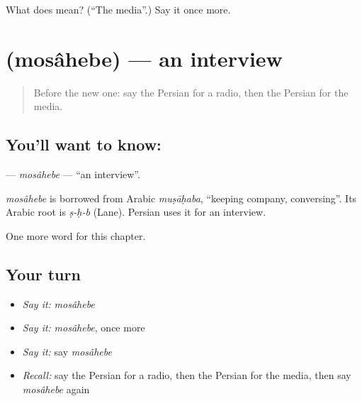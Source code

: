 \begin{tcolorbox}[breakable,colback=teal!4,colframe=teal!35!black,title={Before you move on}]
What does  mean? (\textquotedblleft{}The media\textquotedblright{}.) Say it once more.
\end{tcolorbox}
\section[\texorpdfstring{\fa{مصاحبه} (mosâhebe)}{مصاحبه (mosâhebe)}]{ (mosâhebe) — an interview}

\label{lesson:FA-C210-mosahebe}



\begin{quote}
Before the new one: say the Persian for a radio, then the Persian for the media.
\end{quote}

\subsection*{You'll want to know: }
\textbf{} — \emph{mosâhebe} — \textquotedblleft{}an interview\textquotedblright{}.

\begin{cousinweb}
\emph{mosâhebe} is borrowed from Arabic \emph{muṣāḥaba}, \textquotedblleft{}keeping company, conversing\textquotedblright{}. Its Arabic root is \emph{ṣ-ḥ-b} (Lane). Persian uses it for an interview.
\end{cousinweb}

\begin{grammarlens}[title={What you've built}]
One more word for this chapter.
\end{grammarlens}

\subsection*{Your turn}
\begin{itemize}
\raggedright
  \item \emph{Say it:} \emph{mosâhebe}
  \item \emph{Say it:} \emph{mosâhebe}, once more
  \item \emph{Say it:} say \emph{mosâhebe}
  \item \emph{Recall:} say the Persian for a radio, then the Persian for the media, then say \emph{mosâhebe} again
\end{itemize}

